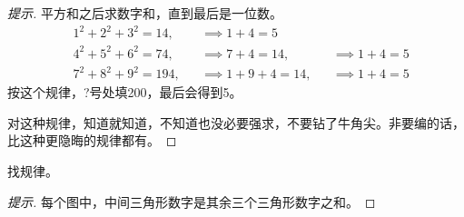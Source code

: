 \begin{proof}[提示]平方和之后求数字和，直到最后是一位数。
  \begin{align*}
    &1^2+2^2+3^2 = 14, && \implies 1 + 4 = 5\\
    &4^2+5^2+6^2 = 74, && \implies 7 + 4 = 14, && \implies 1+4=5\\
    &7^2+8^2+9^2 = 194,&& \implies 1+9+4=14, && \implies 1+4=5
  \end{align*}
  按这个规律，?号处填200，最后会得到5。

  \note 对这种规律，知道就知道，不知道也没必要强求，不要钻了牛角尖。非要编的话，比这种更隐晦的规律都有。
\end{proof}


\begin{example}找规律。
  \begin{center}
  \end{center}
\end{example}
\begin{proof}[提示]
  每个图中，中间三角形数字是其余三个三角形数字之和。
\end{proof}